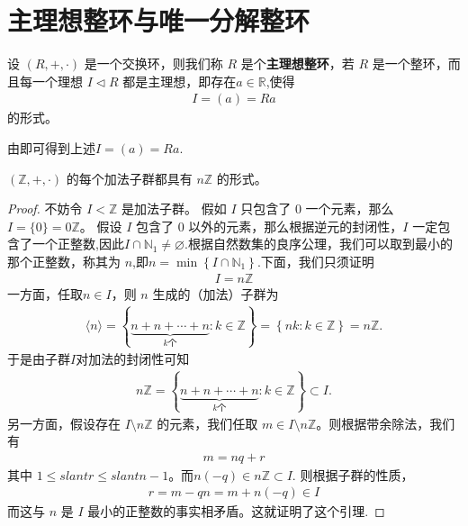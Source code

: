 \documentclass[../../main.tex]{subfiles}
\begin{document}
\section{主理想整环与唯一分解整环}

\begin{definition}[主理想整环]
设 $(R, +, \cdot)$ 是一个交换环，则我们称 $R$ 是个\textbf{主理想整环}，若 $R$ 是一个整环，而且每一个理想 $I \lhd R$ 都是主理想，即存在$a\in \mathbb{R}$,使得
\begin{align*}
I = (a) = Ra
\end{align*}
的形式。
\end{definition}
\begin{remark}
由即可得到上述$I = (a) = Ra.$
\end{remark}

\begin{lemma}\label{lemma:整数环的每个加法子群都是nZ}
$(\mathbb{Z}, +, \cdot)$ 的每个加法子群都具有 $n\mathbb{Z}$ 的形式。
\end{lemma}
\begin{proof}
不妨令 $I < \mathbb{Z}$ 是加法子群。
假如 $I$ 只包含了 $0$ 一个元素，那么 $I = \{0\} = 0\mathbb{Z}$。
假设 $I$ 包含了 $0$ 以外的元素，那么根据逆元的封闭性，$I$ 一定包含了一个正整数,因此$I\cap \mathbb{N} _1\ne \varnothing $.根据自然数集的良序公理，我们可以取到最小的那个正整数，称其为 $n$,即$n=\min \left\{ I\cap \mathbb{N} _1 \right\}$.下面，我们只须证明
\begin{align*}
I = n\mathbb{Z}
\end{align*}
一方面，任取$n \in I$，则 $n$ 生成的（加法）子群为
\begin{align*}
\langle n\rangle =\left\{ \underset{k\text{个}}{\underbrace{n+n+\cdots +n}}:k\in \mathbb{Z} \right\} =\left\{ nk:k\in \mathbb{Z} \right\} =n\mathbb{Z} .
\end{align*}
于是由子群$I$对加法的封闭性可知
\begin{align*}
n\mathbb{Z} =\left\{ \underset{k\text{个}}{\underbrace{n+n+\cdots +n}}:k\in \mathbb{Z} \right\} \subset I.
\end{align*}
另一方面，假设存在 $I \setminus n\mathbb{Z}$ 的元素，我们任取 $m \in I \setminus n\mathbb{Z}$。则根据带余除法，我们有
\begin{align*}
m = nq + r
\end{align*}
其中 $1 \leqslant slant r \leqslant slant n - 1$。而$n(-q)\in n\mathbb{Z}\subset I$.
则根据子群的性质，
\begin{align*}
r = m - qn = m + n(-q) \in I
\end{align*}
而这与 $n$ 是 $I$ 最小的正整数的事实相矛盾。这就证明了这个引理.
\end{proof}
\end{document}
